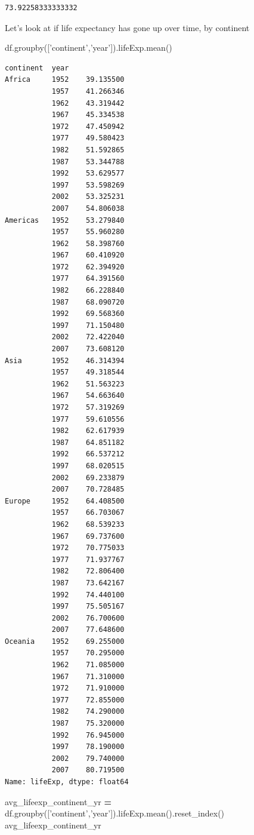 \documentclass[
  letterpaper,
]{scrbook}
\newenvironment{Shaded}{\begin{snugshade}}{\end{snugshade}}
\newcommand{\NormalTok}[1]{#1}
\newcommand{\OperatorTok}[1]{\textcolor[rgb]{0.81,0.36,0.00}{\textbf{#1}}}
\newcommand{\StringTok}[1]{\textcolor[rgb]{0.31,0.60,0.02}{#1}}
\begin{document}
\begin{verbatim}
73.92258333333332
\end{verbatim}

Let's look at if life expectancy has gone up over time, by continent

\begin{Shaded}
\begin{Highlighting}[]
\NormalTok{df.groupby([}\StringTok{'continent'}\NormalTok{,}\StringTok{'year'}\NormalTok{]).lifeExp.mean()}
\end{Highlighting}
\end{Shaded}

\begin{verbatim}
continent  year
Africa     1952    39.135500
           1957    41.266346
           1962    43.319442
           1967    45.334538
           1972    47.450942
           1977    49.580423
           1982    51.592865
           1987    53.344788
           1992    53.629577
           1997    53.598269
           2002    53.325231
           2007    54.806038
Americas   1952    53.279840
           1957    55.960280
           1962    58.398760
           1967    60.410920
           1972    62.394920
           1977    64.391560
           1982    66.228840
           1987    68.090720
           1992    69.568360
           1997    71.150480
           2002    72.422040
           2007    73.608120
Asia       1952    46.314394
           1957    49.318544
           1962    51.563223
           1967    54.663640
           1972    57.319269
           1977    59.610556
           1982    62.617939
           1987    64.851182
           1992    66.537212
           1997    68.020515
           2002    69.233879
           2007    70.728485
Europe     1952    64.408500
           1957    66.703067
           1962    68.539233
           1967    69.737600
           1972    70.775033
           1977    71.937767
           1982    72.806400
           1987    73.642167
           1992    74.440100
           1997    75.505167
           2002    76.700600
           2007    77.648600
Oceania    1952    69.255000
           1957    70.295000
           1962    71.085000
           1967    71.310000
           1972    71.910000
           1977    72.855000
           1982    74.290000
           1987    75.320000
           1992    76.945000
           1997    78.190000
           2002    79.740000
           2007    80.719500
Name: lifeExp, dtype: float64
\end{verbatim}

\begin{Shaded}
\begin{Highlighting}[]
\NormalTok{avg_lifeexp_continent_yr }\OperatorTok{=}\NormalTok{ df.groupby([}\StringTok{'continent'}\NormalTok{,}\StringTok{'year'}\NormalTok{]).lifeExp.mean().reset_index()}
\NormalTok{avg_lifeexp_continent_yr}
\end{Highlighting}
\end{Shaded}
\end{document}
